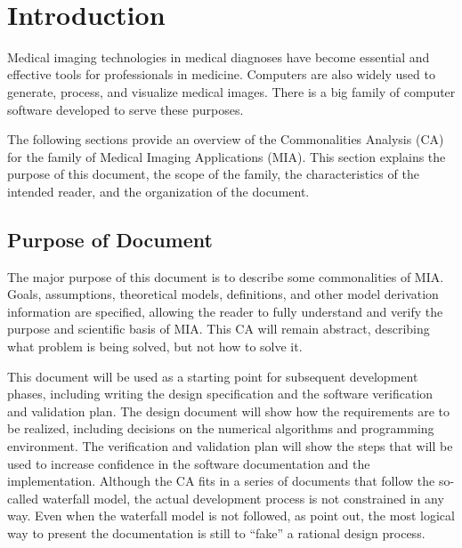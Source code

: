\documentclass[12pt]{article}
\newcommand{\famname}{MIA} %
\begin{document}
\newpage

\tableofcontents

~\newpage


\section{Introduction}

Medical imaging technologies in medical diagnoses have become essential and effective tools for professionals in medicine. Computers are also widely used to generate, process, and visualize medical images. There is a big family of computer software developed to serve these purposes.

The following sections provide an overview of the Commonalities Analysis (CA) for the family of Medical Imaging Applications (\famname). This section explains the purpose of this document, the scope of the family, the characteristics of the intended reader, and the organization of the document. 

\subsection{Purpose of Document}

The major purpose of this document is to describe some commonalities of \famname. Goals, assumptions, theoretical models, definitions, and other model derivation information are specified, allowing the reader to fully understand and verify the purpose and scientific basis of \famname. This CA will remain abstract, describing what problem is being solved, but not how to solve it.

This document will be used as a starting point for subsequent development phases, including writing the design specification and the software verification and validation plan. The design document will show how the requirements are to be realized, including decisions
on the numerical algorithms and programming environment. The verification and validation plan will show the steps that will be used to increase confidence in the software documentation and the implementation. Although the CA fits in a series of documents that follow the so-called waterfall model, the actual development process is not constrained in any way. Even when the waterfall model is not followed, as \cite{ParnasAndClements1986} point out, the most logical way to present the documentation is still to “fake” a rational design process.
\end{document}
